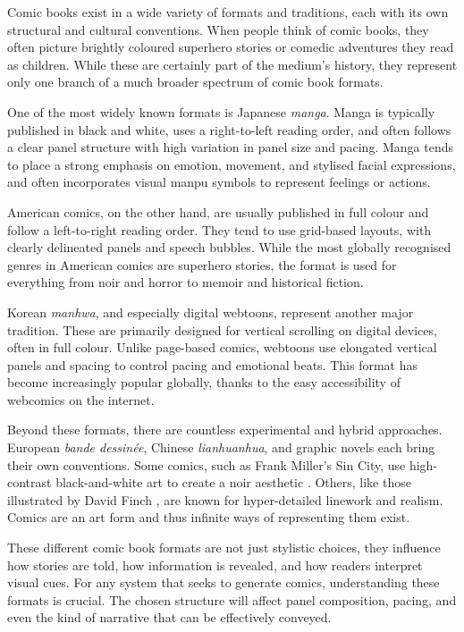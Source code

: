 Comic books exist in a wide variety of formats and traditions, each with its own structural and cultural conventions. When people think of comic books, they often picture brightly coloured superhero stories or comedic adventures they read as children. While these are certainly part of the medium's history, they represent only one branch of a much broader spectrum of comic book formats.

One of the most widely known formats is Japanese \textit{manga}. Manga is typically published in black and white, uses a right-to-left reading order, and often follows a clear panel structure with high variation in panel size and pacing. Manga tends to place a strong emphasis on emotion, movement, and stylised facial expressions, and often incorporates visual manpu symbols to represent feelings or actions.

American comics, on the other hand, are usually published in full colour and follow a left-to-right reading order. They tend to use grid-based layouts, with clearly delineated panels and speech bubbles. While the most globally recognised genres in American comics are superhero stories, the format is used for everything from noir and horror to memoir and historical fiction.

Korean \textit{manhwa}, and especially digital webtoons, represent another major tradition. These are primarily designed for vertical scrolling on digital devices, often in full colour. Unlike page-based comics, webtoons use elongated vertical panels and spacing to control pacing and emotional beats. This format has become increasingly popular globally, thanks to the easy accessibility of webcomics on the internet.

Beyond these formats, there are countless experimental and hybrid approaches. European \textit{bande dessinée}, Chinese \textit{lianhuanhua}, and graphic novels each bring their own conventions. Some comics, such as Frank Miller's Sin City, use high-contrast black-and-white art to create a noir aesthetic \cite{miller1991sincity}. Others, like those illustrated by David Finch \cite{finch2024portfolio}, are known for hyper-detailed linework and realism. Comics are an art form and thus infinite ways of representing them exist.

These different comic book formats are not just stylistic choices, they influence how stories are told, how information is revealed, and how readers interpret visual cues. For any system that seeks to generate comics, understanding these formats is crucial. The chosen structure will affect panel composition, pacing, and even the kind of narrative that can be effectively conveyed.

